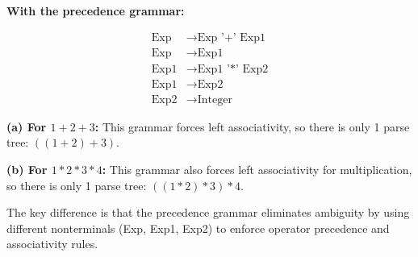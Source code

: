\documentclass{article}
\theoremstyle{plain}
\theoremstyle{definition}
\theoremstyle{remark}
\begin{document}
\textbf{With the precedence grammar:}

\begin{align}
\text{Exp} &\to \text{Exp '+' Exp1} \\
\text{Exp} &\to \text{Exp1} \\
\text{Exp1} &\to \text{Exp1 '*' Exp2} \\
\text{Exp1} &\to \text{Exp2} \\
\text{Exp2} &\to \text{Integer}
\end{align}

\textbf{(a) For $1+2+3$:} This grammar forces left associativity, so there is only 1 parse tree: $((1+2)+3)$.

\textbf{(b) For $1*2*3*4$:} This grammar also forces left associativity for multiplication, so there is only 1 parse tree: $((1*2)*3)*4$.

The key difference is that the precedence grammar eliminates ambiguity by using different nonterminals (Exp, Exp1, Exp2) to enforce operator precedence and associativity rules.
\end{document}

